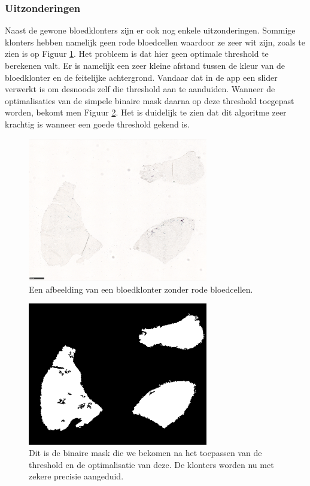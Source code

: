 \documentclass[a4paper,kulak]{kulakarticle}
\begin{document}
\subsubsection{Uitzonderingen}
Naast de gewone bloedklonters zijn er ook nog enkele uitzonderingen. Sommige klonters hebben namelijk geen rode bloedcellen waardoor ze zeer wit zijn, zoals te zien is op Figuur \ref{figuur lichte_kleuring}. Het probleem is dat hier geen optimale threshold te berekenen valt. Er is namelijk een zeer kleine afstand tussen de kleur van de bloedklonter en de feitelijke achtergrond. Vandaar dat in de app een slider verwerkt is om desnoods zelf die threshold aan te aanduiden. Wanneer de optimalisaties van de simpele binaire mask daarna op deze threshold toegepast worden, bekomt men Figuur \ref{figuur lichte_kleuring_binair}. Het is duidelijk te zien dat dit algoritme zeer krachtig is wanneer een goede threshold gekend is.

\begin{figure}[H]
	\centering
	\includegraphics[width=0.7\textwidth]{lichte_kleuring}
	
	\caption{Een afbeelding van een bloedklonter zonder rode bloedcellen.}
	\label{figuur lichte_kleuring}
\end{figure}

\begin{figure}[H]
	\centering
	\includegraphics[width=0.7\textwidth]{lichte_kleuring_binair}
	
	\caption{Dit is de binaire mask die we bekomen na het toepassen van de threshold en de optimalisatie van deze. De klonters worden nu met zekere precisie aangeduid.}
	\label{figuur lichte_kleuring_binair}
\end{figure}
\end{document}
